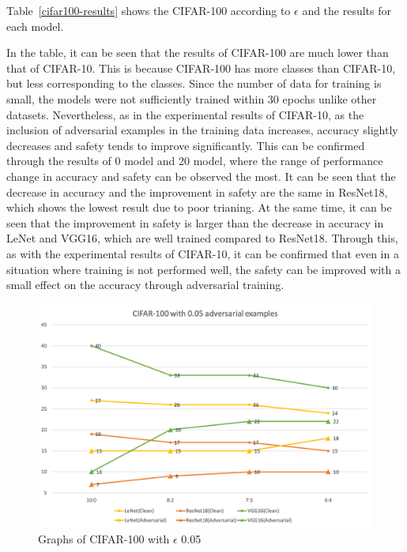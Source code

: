 \documentclass[journal,article,submit,moreauthors,pdftex]{Definitions/mdpi}
\begin{document}
Table~\ref{cifar100-results} shows the CIFAR-100 according to \begin{math}\epsilon\end{math} and the results for each model.

In the table, it can be seen that the results of CIFAR-100 are much lower than that of CIFAR-10.
This is because CIFAR-100 has more classes than CIFAR-10, but less corresponding to the classes. Since the number of data for training is small, the models were not sufficiently trained within 30 epochs unlike other datasets. 
Nevertheless, as in the experimental results of CIFAR-10, as the inclusion of adversarial examples in the training data increases, accuracy slightly decreases and safety tends to improve significantly.
This can be confirmed through the results of 0 model and 20 model, where the range of performance change in accuracy and safety can be observed the most.
It can be seen that the decrease in accuracy and the improvement in safety are the same in ResNet18, which shows the lowest result due to poor trianing.
At the same time, it can be seen that the improvement in safety is larger than the decrease in accuracy in LeNet and VGG16, which are well trained compared to ResNet18.
Through this, as with the experimental results of CIFAR-10, it can be confirmed that even in a situation where training is not performed well, the safety can be improved with a small effect on the accuracy through adversarial training.

\begin{figure}[H]
    \includegraphics[width=13 cm]{Definitions/graph-005cifar100.png}
    \caption{Graphs of CIFAR-100 with \begin{math}\epsilon\end{math} 0.05\label{cifar100-0.05-graph}}
\end{figure} 
\end{document}
